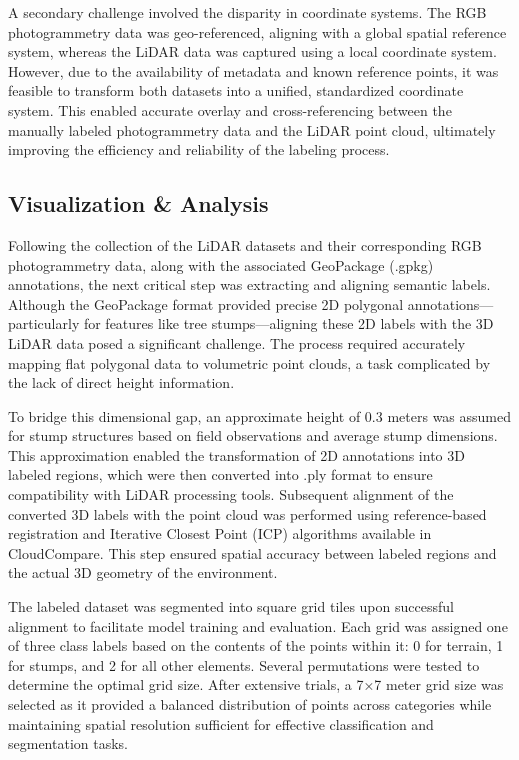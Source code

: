 \documentclass[../report.tex]{subfiles}
\begin{document}
    A secondary challenge involved the disparity in coordinate systems. The RGB photogrammetry data was geo-referenced, aligning with a global spatial reference system, whereas the LiDAR data was captured using a local coordinate system. However, due to the availability of metadata and known reference points, it was feasible to transform both datasets into a unified, standardized coordinate system. This enabled accurate overlay and cross-referencing between the manually labeled photogrammetry data and the LiDAR point cloud, ultimately improving the efficiency and reliability of the labeling process.
    
	\subsection{Visualization & Analysis}
    Following the collection of the LiDAR datasets and their corresponding RGB photogrammetry data, along with the associated GeoPackage (.gpkg) annotations, the next critical step was extracting and aligning semantic labels. Although the GeoPackage format provided precise 2D polygonal annotations—particularly for features like tree stumps—aligning these 2D labels with the 3D LiDAR data posed a significant challenge. The process required accurately mapping flat polygonal data to volumetric point clouds, a task complicated by the lack of direct height information.

    To bridge this dimensional gap, an approximate height of 0.3 meters was assumed for stump structures based on field observations and average stump dimensions. This approximation enabled the transformation of 2D annotations into 3D labeled regions, which were then converted into .ply format to ensure compatibility with LiDAR processing tools. Subsequent alignment of the converted 3D labels with the point cloud was performed using reference-based registration and Iterative Closest Point (ICP) algorithms available in CloudCompare. This step ensured spatial accuracy between labeled regions and the actual 3D geometry of the environment.
    
    The labeled dataset was segmented into square grid tiles upon successful alignment to facilitate model training and evaluation. Each grid was assigned one of three class labels based on the contents of the points within it: 0 for terrain, 1 for stumps, and 2 for all other elements. Several permutations were tested to determine the optimal grid size. After extensive trials, a 7×7 meter grid size was selected as it provided a balanced distribution of points across categories while maintaining spatial resolution sufficient for effective classification and segmentation tasks.
    
\end{document}
